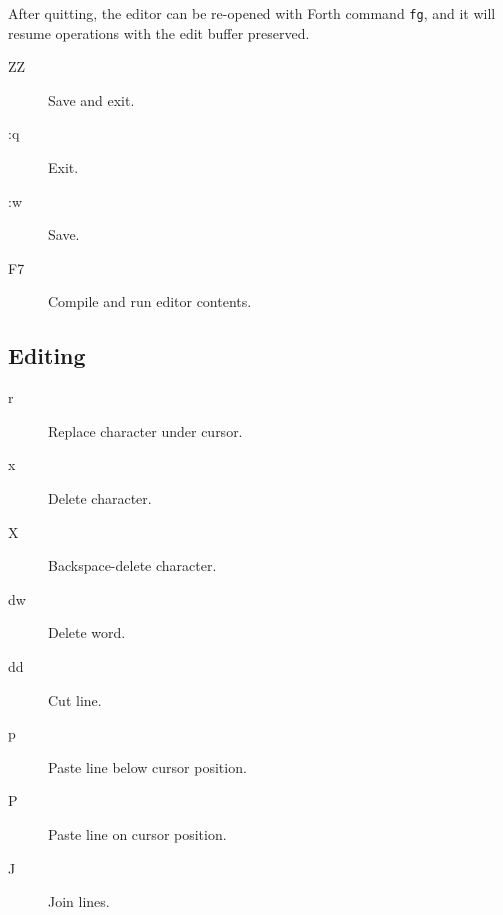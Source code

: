 After quitting, the editor can be re-opened with Forth command \texttt{fg}, and it will resume operations with the edit buffer preserved.

\begin{description}
\item[ZZ] Save and exit.
\item[:q] Exit.
\item[:w] Save.
\item[F7] Compile and run editor contents.
\end{description}

\subsection{Editing}
\begin{description}
\item[r] Replace character under cursor.
\item[x] Delete character.
\item[X] Backspace-delete character.
\item[dw] Delete word.
\item[dd] Cut line.
\item[p] Paste line below cursor position.
\item[P] Paste line on cursor position.
\item[J] Join lines.
\end{description}
